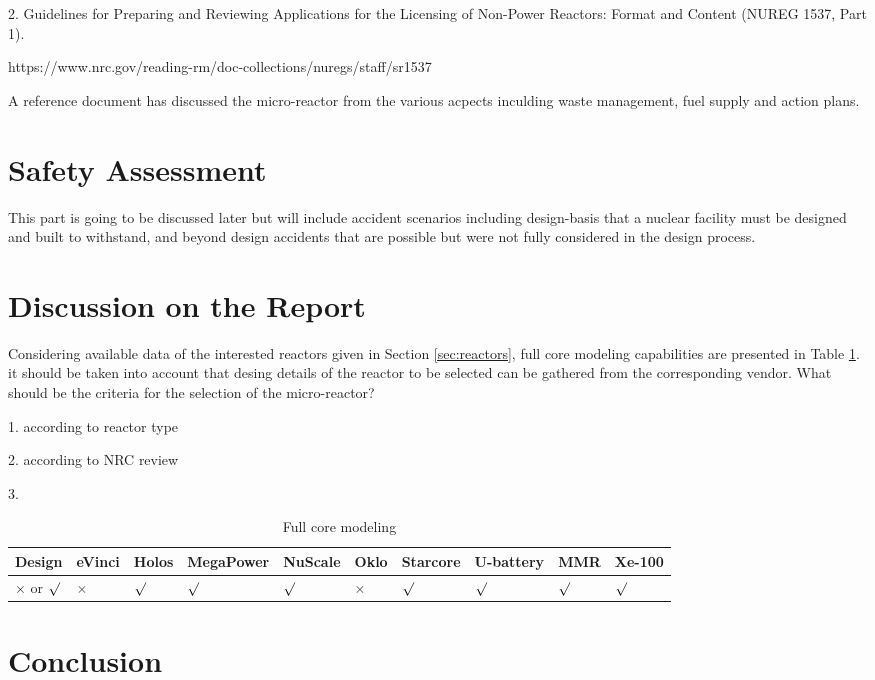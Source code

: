 \documentclass[10pt,a4paper]{article}
\begin{document}
2. Guidelines for Preparing and Reviewing Applications for the Licensing of Non-Power Reactors: Format and Content (NUREG 1537, Part 1). 


https://www.nrc.gov/reading-rm/doc-collections/nuregs/staff/sr1537

A reference document \cite{nichol_roadmap_2018} has discussed  the micro-reactor from the various acpects inculding waste management, fuel supply and action plans.


\section{Safety Assessment}
This part is going to be discussed later but will include accident scenarios including design-basis that a nuclear facility must be designed and built to withstand, and beyond design accidents that are possible but were not fully considered in the design process.

\section{Discussion on the Report}

Considering available data of the interested reactors given in Section \ref{sec:reactors}, full core modeling capabilities are presented in Table \ref{table:feasiblity}. it should be taken into account that desing details of the reactor to be selected can be gathered from the corresponding vendor. What should be the criteria for the selection of the micro-reactor?

1. according to reactor type

2. according to NRC review

3. 

\begin{table} [ht]
\begin{center}

\caption{Full core modeling}
\label{table:feasiblity}
\begin{tabular}{|l|l|l|l|l|l|l|l|l|l|}
\hline 
Design 		&eVinci 		& Holos		&MegaPower 	& NuScale		& Oklo 		& Starcore		& U-battery 	 & MMR	& Xe-100 \\ 
\hline 
$\times$ or 	$\surd$ 		&  $\times$		& $\surd$		& $\surd$ 	&   $\surd$		&  $\times$		& $\surd$	&  $\surd$ 	&  $\surd$	&  $\surd$ \\ 
\hline 

\end{tabular}
\end{center}
\end{table}

\pagebreak
\section{Conclusion}

\pagebreak


\end{document}
